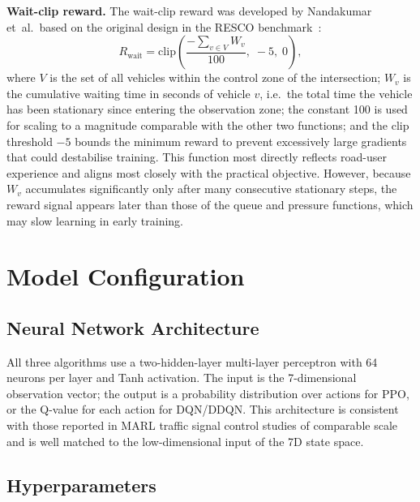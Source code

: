 \noindent\textbf{Wait-clip reward.}\;
The wait-clip reward was developed by Nandakumar et~al.\ based on the original
design in the RESCO benchmark~\cite{nandakumar2025,ault2021resco}:
\begin{equation}
    R_\mathrm{wait} =
        \mathrm{clip}\!\left(
          \frac{-\displaystyle\sum_{v\in V} W_v}{100},\;
          -5,\; 0
        \right),
\end{equation}
where $V$ is the set of all vehicles within the control zone of the
intersection; $W_v$ is the cumulative waiting time in seconds of vehicle $v$,
i.e.\ the total time the vehicle has been stationary since entering the
observation zone; the constant 100 is used for scaling to a magnitude
comparable with the other two functions; and the clip threshold $-5$ bounds the
minimum reward to prevent excessively large gradients that could destabilise
training. This function most directly reflects road-user experience and aligns
most closely with the practical objective. However, because $W_v$ accumulates
significantly only after many consecutive stationary steps, the reward signal
appears later than those of the queue and pressure functions, which may slow
learning in early training.

\section{Model Configuration}

\subsection{Neural Network Architecture}

All three algorithms use a two-hidden-layer multi-layer perceptron with
64 neurons per layer and Tanh activation. The input is the 7-dimensional
observation vector; the output is a probability distribution over actions for
PPO, or the Q-value for each action for DQN/DDQN. This architecture is
consistent with those reported in MARL traffic signal control studies of
comparable scale~\cite{ault2021resco} and is well matched to the low-dimensional
input of the 7D state space.

\subsection{Hyperparameters}

